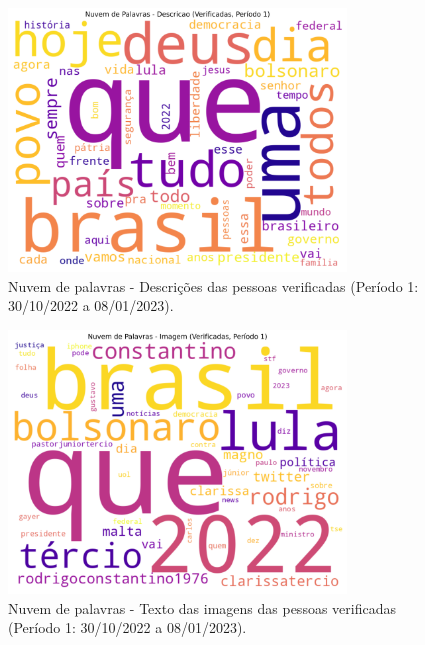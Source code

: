 \documentclass[manuscript,screen,review]{acmart}
\begin{document}
\begin{figure}[h]
\centering
\includegraphics[width=0.8\textwidth]{figura17_nuvem_verificadas_desc_periodo1.png}
\caption{Nuvem de palavras - Descrições das pessoas verificadas (Período 1: 30/10/2022 a 08/01/2023).}
\label{fig:figura17}
\end{figure}

\begin{figure}[h]
\centering
\includegraphics[width=0.8\textwidth]{figura18_nuvem_verificadas_img_periodo1.png}
\caption{Nuvem de palavras - Texto das imagens das pessoas verificadas (Período 1: 30/10/2022 a 08/01/2023).}
\label{fig:figura18}
\end{figure}
\end{document}

